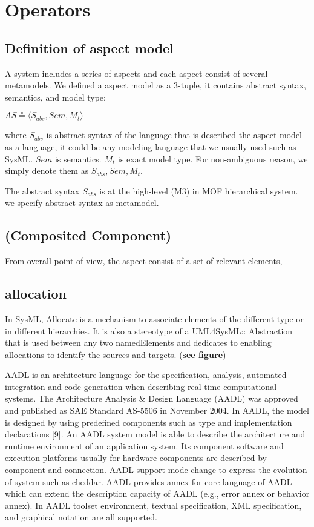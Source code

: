 \section{Operators}
\subsection{Definition of aspect model}
A system includes a series of aspects and each aspect consist of several metamodels. We defined a aspect model as a 3-tuple, it contains abstract syntax, semantics, and model type:
\begin{center}
	$AS \circeq \langle S_{abs}, Sem, M_{t}\rangle $
\end{center}
where $S_{abs}$ is abstract syntax of the language that is described the aspect model as a language, it could be any modeling language that we usually used such as SysML. $Sem$ is semantics. $M_{t}$ is exact model type. For non-ambiguous reason, we simply denote them as  $S_{abs}, Sem, M_{t}$.

The abstract syntax $S_{abs}$ is at the high-level (M3) in MOF hierarchical system. we specify abstract syntax as metamodel.   

\subsection{(Composited Component)}

From overall point of view, the aspect consist of a set of relevant elements,  

\subsection{allocation}
In SysML, Allocate is a mechanism to associate elements of the different type or in different hierarchies. It is also a stereotype of a UML4SysML:: Abstraction that is used between any two namedElements and dedicates to enabling allocations to identify the sources and targets. (\textbf{see figure}) 

AADL is an architecture language for the specification, analysis, automated integration and code generation when describing real-time computational systems. The Architecture Analysis \& Design Language (AADL) was approved and published as SAE Standard AS-5506 in November 2004. In AADL, the model is designed by using predefined components such as type and implementation declarations  [9]. An AADL system model is able to describe the architecture and runtime environment of an application system. Its component software and execution platforms usually for hardware components are described by component and connection. AADL support mode change to express the evolution of system such as cheddar. AADL provides annex for core language of AADL which can extend the description capacity of AADL (e.g., error annex or behavior annex). In AADL toolset environment, textual specification, XML specification, and graphical notation are all supported.

